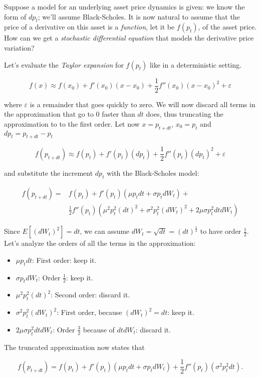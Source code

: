 \documentclass[oneside,titlepage,headinclude,12pt,a4paper,BCOR5mm,footinclude]{book}
\theoremstyle{defn}
\begin{document}
Suppose a model for  an underlying asset price dynamics is  given: we know the
form of $dp_t$;  we'll assume Black-Scholes. It is now  natural to assume that
the price  of a  derivative on this  asset is a  \textit{function}, let  it be
$f(p_t)$, of the asset price. How can we get a \textit{stochastic differential
equation} that models the derivative price variation?

Let's evaluate the \textit{Taylor expansion} for $f(p_t)$ like in a deterministic setting.

\[
  f(x) \approx f(x_0) + f'(x_0)(x-x_0) + \frac{1}{2} f''(x_0)(x-x_0)^2 + \varepsilon
\]

where $\varepsilon$  is a  remainder that  goes quickly to  zero. We  will now
discard all  terms in the  approximation that go to  0 faster than  $dt$ does,
thus truncating the approximation to to the first order. Let now $x=p_{t+dt}$,
$x_0 = p_t$ and $dp_t = p_{t+dt} - p_t$

\[
  f(p_{t+dt}) \approx f(p_t) + f'(p_t)(dp_t) + \frac{1}{2} f''(p_t)(dp_t)^2 + \varepsilon
\]

and substitute the increment $dp_t$ with the Black-Scholes model:

\begin{align*}
  f(p_{t+dt}) = & f(p_t) + f'(p_t)(\mu p_t dt + \sigma p_t dW_t) +\\ 
                & \frac{1}{2}f''(p_t)(\mu^2 p_t^2 (dt)^2 + \sigma^2 p_t^2 (dW_t)^2 + 2 \mu \sigma p_t^2 dtdW_t) 
\end{align*}

Since $E[(dW_t)^2] = dt$, we can  assume $dW_t = \sqrt{dt} = (dt)^\frac{1}{2}$
to have order $\frac{1}{2}$. Let's analyze the  orders of all the terms in the
approximation:
\begin{itemize}
  \item $\mu p_t dt$: First order: keep it.
  \item $\sigma p_t dW_t$: Order $\frac{1}{2}$: keep it.
  \item $\mu^2 p_t^2 (dt)^2$: Second order: discard it.
  \item $\sigma^2 p_t^2 (dW_t)^2$: First order, because $(dW_t)^2 = dt$: keep it.
  \item $2 \mu \sigma p_t^2 dtdW_t$: Order $\frac{3}{2}$ because of $dtdW_t$: discard it.
\end{itemize}
The truncated approximation now states that

\[
  f(p_{t+dt}) = f(p_t) + f'(p_t)(\mu p_t dt + \sigma p_t dW_t) + 
  \frac{1}{2} f''(p_t)(\sigma^2 p_t^2 dt). 
\]
\end{document}

